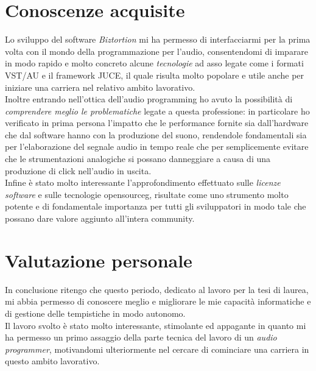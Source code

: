 \section{Conoscenze acquisite}
Lo sviluppo del software \textit{Biztortion} mi ha permesso di interfacciarmi per la prima volta con il mondo della programmazione per l'audio, consentendomi di imparare in modo rapido e molto concreto alcune \textit{tecnologie} ad asso legate come i formati VST/AU e il framework JUCE, il quale risulta molto popolare e utile anche per iniziare una carriera nel relativo ambito lavorativo. \\
Inoltre entrando nell'ottica dell'audio programming ho avuto la possibilità di \textit{comprendere meglio le problematiche} legate a questa professione: in particolare ho verificato in prima persona l'impatto che le performance fornite sia dall'hardware che dal software hanno con la produzione del suono, rendendole fondamentali sia per l'elaborazione del segnale audio in tempo reale che per semplicemente evitare che le strumentazioni analogiche si possano danneggiare a causa di una produzione di click nell'audio in uscita. \\
Infine è stato molto interessante l'approfondimento effettuato sulle \textit{licenze software} e sulle tecnologie \gls{opensourceg}, risultate come uno strumento molto potente e di fondamentale importanza per tutti gli sviluppatori in modo tale che possano dare valore aggiunto all'intera community.

\section{Valutazione personale}
In conclusione ritengo che questo periodo, dedicato al lavoro per la tesi di laurea, mi abbia permesso di conoscere meglio e migliorare le mie capacità informatiche e di gestione delle tempistiche in modo autonomo. \\
Il lavoro svolto è stato molto interessante, stimolante ed appagante in quanto mi ha permesso un primo assaggio della parte tecnica del lavoro di un \textit{audio programmer}, motivandomi ulteriormente nel cercare di cominciare una carriera in questo ambito lavorativo.